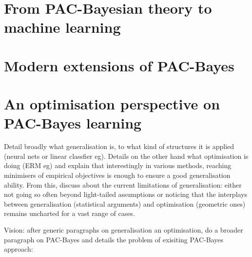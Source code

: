 


\section{From PAC-Bayesian theory to machine learning}

\section{Modern extensions of PAC-Bayes}

\section{An optimisation perspective on PAC-Bayes learning}

\newpage
Detail broadly what generalisation is, to what kind of structures it is applied (neural nets or linear classfier eg). Details on the other hand what optimisation is doing (ERM eg) and explain that interestingly in various methods, reaching minimisers of empirical objectives is enough to ensure a good generalisation ability. From this, discuss about the current limitations of generalisation: either not going so often beyond light-tailed assumptions or noticing that the interplays between generalisation (statistical arguments) and optimisation (geometric ones) remains uncharted for a vast range of cases.

Vision: after generic paragraphs on generalisation an optimisation, do a broader paragraph on PAC-Bayes and details the problem of exisiting PAC-Bayes approach: 

